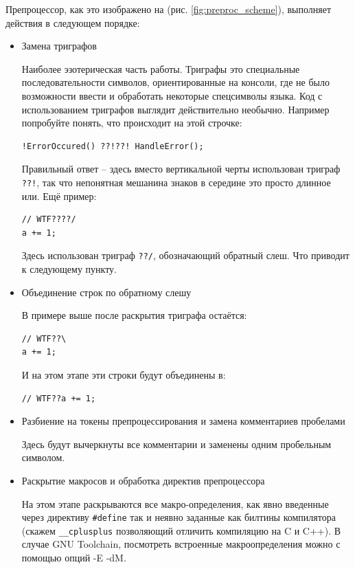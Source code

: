 \documentclass[a4paper,12pt,oneside]{article}
\begin{document}
Препроцессор, как это изображено на (рис. \ref{fig:preproc_scheme}), выполняет действия в следующем порядке:

\begin{itemize}
\item Замена триграфов 

Наиболее эзотерическая часть работы. Триграфы это специальные последовательности символов, ориентированные на консоли, где не было возможности ввести и обработать некоторые спецсимволы языка. Код с использованием триграфов выглядит действительно необычно. Например попробуйте понять, что происходит на этой строчке: 

\begin{lstlisting}
!ErrorOccured() ??!??! HandleError();
\end{lstlisting}

Правильный ответ -- здесь вместо вертикальной черты использован триграф \lstinline$??!$, так что непонятная мешанина знаков в середине это просто длинное или. Ещё пример: 

\begin{lstlisting}
// WTF????/
a += 1;
\end{lstlisting}

Здесь использован триграф \lstinline$??/$, обозначающий обратный слеш. Что приводит к следующему пункту.

\item Объединение строк по обратному слешу

В примере выше после раскрытия триграфа остаётся:
\begin{lstlisting}
// WTF??\
a += 1;
\end{lstlisting}
И на этом этапе эти строки будут объединены в:
\begin{lstlisting}
// WTF??a += 1;
\end{lstlisting}

\item Разбиение на токены препроцессирования и замена комментариев пробелами

Здесь будут вычеркнуты все комментарии и заменены одним пробельным символом.

\item Раскрытие макросов и обработка директив препроцессора

На этом этапе раскрываются все макро-определения, как явно введенные через директиву \lstinline!#define! так и неявно заданные как билтины компилятора (скажем \lstinline!__cplusplus! позволяющий отличить компиляцию на C и C++). В случае GNU Toolchain, посмотреть встроенные макроопределения можно с помощью опций -E -dM.


\end{itemize}
\end{document}
